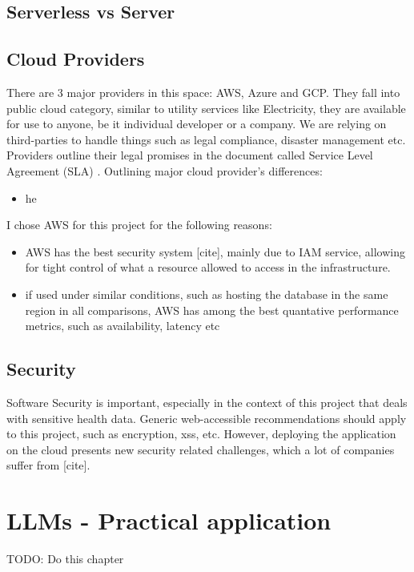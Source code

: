 \subsection{Serverless vs Server}
\subsection{Cloud Providers}
There are 3 major providers in this space: AWS, Azure and GCP. They fall into public cloud category, similar to utility services like Electricity, they are available for use to anyone, be it individual developer or a company. We are relying on third-parties to handle things such as legal compliance, disaster management etc. Providers outline their legal promises in the document called Service Level Agreement (SLA) \cite{cloudSLA}. Outlining major cloud provider's differences:
\begin{itemize}
    \item {he}
\end{itemize}

I chose AWS for this project for the following reasons:
\begin{itemize}
    \item{AWS has the best security system [cite], mainly due to IAM service, allowing for tight control of what a resource allowed to access in the infrastructure. }
    \item{if used under similar conditions, such as hosting the database in the same region in all comparisons, AWS has among the best quantative performance metrics, such as availability, latency etc \cite{CloudMetrics}  }
\end{itemize}
\subsection{Security}
Software Security is important, especially in the context of this project that deals with sensitive health data. Generic web-accessible recommendations should apply to this project, such as encryption, xss, etc. However, deploying the application on the cloud presents new security related challenges, which a lot of companies suffer from [cite]. 
\section{LLMs - Practical application}


TODO: Do this chapter